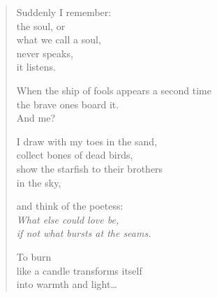 \begin{verse}
Suddenly I remember:\\
the soul, or\\
what we call a soul,\\
never speaks,\\
it listens.

When the ship of fools appears a second time\\
the brave ones board it.\\
And me?

I draw with my toes in the sand,\\
collect bones of dead birds,\\
show the starfish to their brothers\\
in the sky,

and think of the poetess:\\
{\itshape What else could love be,\\
if not what bursts at the seams.}

To burn\\
like a candle transforms itself\\
into warmth and light\ldots

\end{verse}
